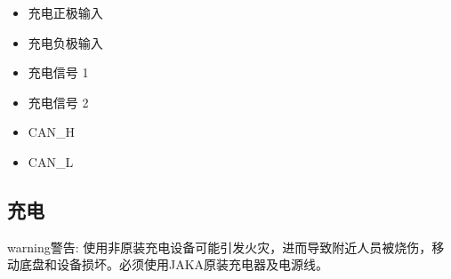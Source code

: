 \documentclass[a4paper,11pt,english,openany,oneside]{sphinxmanual}
\begin{document}
\begin{itemize}
\item {} 
 充电正极输入

\item {} 
 充电负极输入

\item {} 
 充电信号 1

\item {} 
 充电信号 2

\item {} 
 CAN\_H

\item {} 
 CAN\_L

\end{itemize}


\subsection{充电}
\label{\detokenize{08 _u5b89_u88c5_u4e0e_u8c03_u8bd5:id19}}\label{\detokenize{08 _u5b89_u88c5_u4e0e_u8c03_u8bd5:id20}}
\begin{sphinxadmonition}{warning}{警告:}
\sphinxAtStartPar
使用非原装充电设备可能引发火灾，进而导致附近人员被烧伤，移动底盘和设备损坏。必须使用JAKA原装充电器及电源线。
\end{sphinxadmonition}
\end{document}
